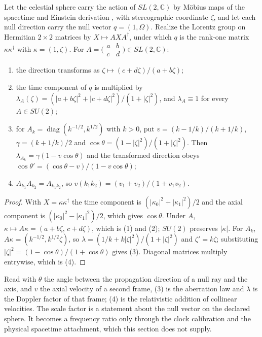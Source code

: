 \begin{proposition}
\label{prop:celestial-kinematics}
Let the celestial sphere carry the action of \(SL(2,\mathbb C)\) by M\"obius
maps of the spacetime and Einstein derivation \cite{ophEinstein}, with stereographic coordinate \(\zeta\), and let each null
direction carry the null vector \(q=(1,\Omega)\). Realize the Lorentz
group on Hermitian \(2\times2\) matrices by \(X\mapsto AXA^\dagger\), under
which \(q\) is the rank-one matrix \(\kappa\kappa^\dagger\) with
\(\kappa=(1,\zeta)\). For \(A=\bigl(\begin{smallmatrix}a&b\\ c&d\end{smallmatrix}\bigr)\in SL(2,\mathbb C)\):
\begin{enumerate}
\item the direction transforms as \(\zeta\mapsto(c+d\zeta)/(a+b\zeta)\);
\item the time component of \(q\) is multiplied by
 \(\lambda_A(\zeta)=(|a+b\zeta|^2+|c+d\zeta|^2)/(1+|\zeta|^2)\), and
 \(\lambda_A\equiv1\) for every \(A\in SU(2)\);
\item for \(A_k=\operatorname{diag}(k^{-1/2},k^{1/2})\) with \(k>0\), put
 \(v=(k-1/k)/(k+1/k)\), \(\gamma=(k+1/k)/2\) and
 \(\cos\theta=(1-|\zeta|^2)/(1+|\zeta|^2)\). Then
 \(\lambda_{A_k}=\gamma(1-v\cos\theta)\) and the transformed direction obeys
 \(\cos\theta'=(\cos\theta-v)/(1-v\cos\theta)\);
\item \(A_{k_1}A_{k_2}=A_{k_1k_2}\), so \(v(k_1k_2)=(v_1+v_2)/(1+v_1v_2)\).
\end{enumerate}
\end{proposition}

\begin{proof}
With \(X=\kappa\kappa^\dagger\) the time component is
\((|\kappa_0|^2+|\kappa_1|^2)/2\) and the axial component is
\((|\kappa_0|^2-|\kappa_1|^2)/2\), which gives \(\cos\theta\). Under
\(A\), \(\kappa\mapsto A\kappa=(a+b\zeta,\,c+d\zeta)\), which is (1) and
(2); \(SU(2)\) preserves \(|\kappa|\). For \(A_k\), \(A\kappa=(k^{-1/2},
k^{1/2}\zeta)\), so \(\lambda=(1/k+k|\zeta|^2)/(1+|\zeta|^2)\) and
\(\zeta'=k\zeta\); substituting \(|\zeta|^2=(1-\cos\theta)/(1+\cos\theta)\)
gives (3). Diagonal matrices multiply entrywise, which is (4).
\end{proof}

Read with \(\theta\) the angle between the propagation direction of a null
ray and the axis, and \(v\) the axial velocity of a second frame, (3) is
the aberration law and \(\lambda\) is the Doppler factor of that frame; (4)
is the relativistic addition of collinear velocities. The scale factor is a
statement about the null vector on the declared sphere. It becomes a
frequency ratio only through the clock calibration and the physical
spacetime attachment, which this section does not supply.

